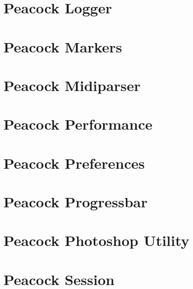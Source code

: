 \documentclass[a4paper,11pt,openany,oneside,english]{sphinxmanual}
\begin{document}
\section{Peacock Logger}
\label{\detokenize{modules/logger/readme:peacock-logger}}\label{\detokenize{modules/logger/readme::doc}}

\section{Peacock Markers}
\label{\detokenize{modules/markers/readme:peacock-markers}}\label{\detokenize{modules/markers/readme::doc}}

\section{Peacock Midiparser}
\label{\detokenize{modules/midiparser/readme:peacock-midiparser}}\label{\detokenize{modules/midiparser/readme::doc}}

\section{Peacock Performance}
\label{\detokenize{modules/performance/readme:peacock-performance}}\label{\detokenize{modules/performance/readme::doc}}

\section{Peacock Preferences}
\label{\detokenize{modules/preferences/readme:peacock-preferences}}\label{\detokenize{modules/preferences/readme::doc}}

\section{Peacock Progressbar}
\label{\detokenize{modules/progressbar/readme:peacock-progressbar}}\label{\detokenize{modules/progressbar/readme::doc}}

\section{Peacock Photoshop Utility}
\label{\detokenize{modules/ps_utils/readme:peacock-photoshop-utility}}\label{\detokenize{modules/ps_utils/readme::doc}}

\section{Peacock Session}
\label{\detokenize{modules/session/readme:peacock-session}}\label{\detokenize{modules/session/readme::doc}}
\end{document}
